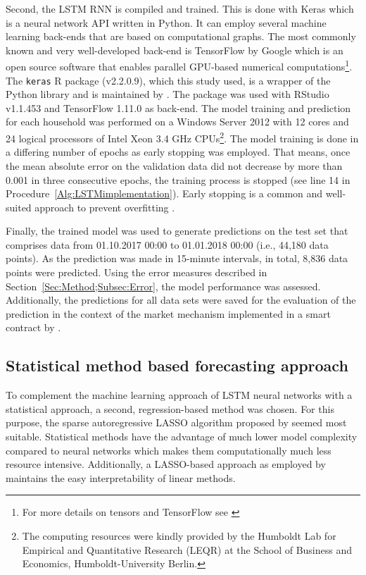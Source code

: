 %
Second, the LSTM RNN is compiled and trained. This is done with Keras which is a neural network API written in Python. It can employ several machine learning back-ends that are based on computational graphs. The most commonly known and very well-developed back-end is TensorFlow by Google which is an open source software that enables parallel GPU-based numerical computations\footnote{For more details on tensors and TensorFlow see \citet{Abadi:2017, Goldsborough:2016}}. The \texttt{keras} R package (v2.2.0.9), which this study used, is a wrapper of the Python library and is maintained by \citet{chollet:2017kerasR}. The package was used with RStudio v1.1.453 and TensorFlow 1.11.0 as back-end. The model training and prediction for each household was performed on a Windows Server 2012 with 12 cores and 24 logical processors of Intel Xeon 3.4 GHz CPUs\footnote{The computing resources were kindly provided by the Humboldt Lab for Empirical and Quantitative Research (LEQR) at the School of Business and Economics, Humboldt-University Berlin.}. The model training is done in a differing number of epochs as early stopping was employed. That means, once the mean absolute error on the validation data did not decrease by more than 0.001 in three consecutive epochs, the training process is stopped (see line 14 in Procedure~\ref{Alg:LSTMimplementation}). Early stopping is a common and well-suited approach to prevent overfitting \citep{chollet:2018}.

Finally, the trained model was used to generate predictions on the test set that comprises data from 01.10.2017 00:00 to 01.01.2018 00:00 (i.e., 44,180 data points). As the prediction was made in 15-minute intervals, in total, 8,836 data points were predicted. Using the error measures described in Section~\ref{Sec:Method;Subsec:Error}, the model performance was assessed. Additionally, the predictions for all data sets were saved for the evaluation of the prediction in the context of the market mechanism implemented in a smart contract by \citet{Mengelkamp:2018a}.


\subsection{Statistical method based forecasting approach} \label{Sec:Method;Subsec:LASSO}

To complement the machine learning approach of LSTM neural networks with a statistical approach, a second, regression-based method was chosen. For this purpose, the sparse autoregressive LASSO algorithm proposed by \citet{Li:2017} seemed most suitable. Statistical methods have the advantage of much lower model complexity compared to neural networks which makes them computationally much less resource intensive. Additionally, a LASSO-based approach as employed by \citet{Li:2017} maintains the easy interpretability of linear methods.




